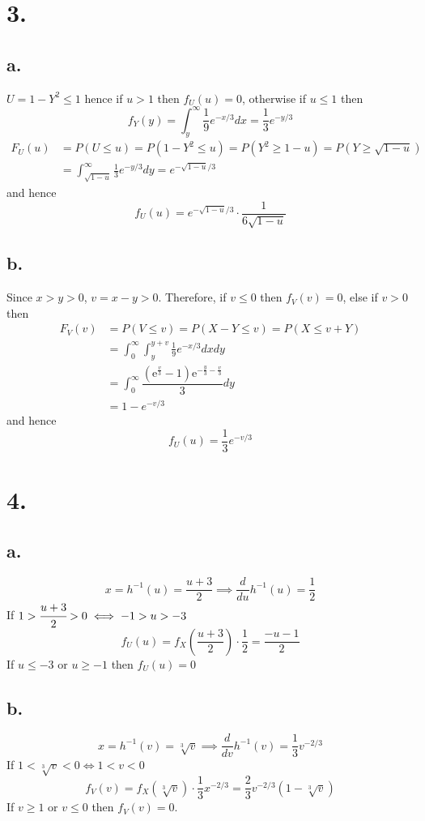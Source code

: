 \documentclass[11pt]{article}
\begin{document}
\section*{3.}
\subsection*{a.}
$U = 1-Y^2 \le 1$ hence if $u > 1$ then $f_U(u) = 0$, otherwise if $u\le 1$ then 
\[
    f_Y(y) = \int_y^\infty \frac{1}{9}e^{-x/3} dx = \frac{1}{3}e^{-y/3}    
\]
\begin{equation*}
    \begin{aligned}
        F_U(u) &= P(U\le u) = P(1-Y^2 \le u) = P(Y^2 \ge 1-u) = P(Y\ge \sqrt{1-u}) \\
        &= \int_{\sqrt{1-u}}^\infty \frac{1}{3}e^{-y/3} dy  = e^{-\sqrt{1-u}/3} 
    \end{aligned}
\end{equation*}
and hence 
\[
    f_U(u) = e^{-\sqrt{1-u}/3} \cdot \frac{1}{6\sqrt{1-u}}
\]
\subsection*{b.}
Since $x>y>0$, $v=x-y>0$. Therefore, if $v\le 0$ then $f_V(v) = 0$, else if $v > 0$ then 
\begin{equation*}
    \begin{aligned}
        F_V(v) &= P(V\le v) = P(X-Y\le v) = P(X\le v+Y) \\
        &= \int_0^\infty \int_y^{y+v} \frac{1}{9}e^{-x/3} dx dy \\
        &= \int_0^\infty \dfrac{\left(\mathrm{e}^\frac{v}{3}-1\right)\mathrm{e}^{-\frac{y}{3}-\frac{v}{3}}}{3} dy  \\
        &= 1 - e^{-v/3}
    \end{aligned}
\end{equation*}
and hence
\[
    f_U(u) = \frac{1}{3}e^{-v/3}    
\]
\pagebreak
\section*{4.}
\subsection*{a.}
\[
    x = h^{-1}(u) = \frac{u+3}{2} \implies \frac{d}{du}h^{-1}(u) = \frac{1}{2}
\]
If $1>\cfrac{u+3}{2} > 0 \iff -1>u>-3$
\[
    f_U(u) = f_X\left(\frac{u+3}{2}\right) \cdot \frac{1}{2} = \frac{-u-1}{2}  
\]
If $u\le -3$ or $u \ge -1$ then $f_U(u) = 0$
\subsection*{b.}
\[
    x = h^{-1}(v) = \sqrt[3]{v} \implies \frac{d}{dv}h^{-1}(v) = \frac{1}{3} v^{-2/3}     
\]
If $1<\sqrt[3]{v}<0 \iff 1<v<0$
\[
    f_V(v) = f_X(\sqrt[3]{v}) \cdot \frac{1}{3}x^{-2/3} = \frac{2}{3}v^{-2/3}(1-\sqrt[3]{v}) 
\]
If $v\ge 1$ or $v \le 0$ then $f_V(v) = 0$.
\pagebreak
\end{document}
